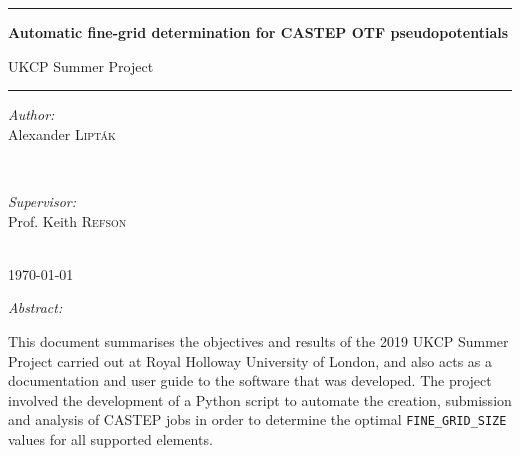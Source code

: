 \documentclass[article]{revtex4}
\begin{document}
\begin{titlepage}
\begin{center}
\vspace*{2cm}

\noindent\rule{\textwidth}{1pt}\vspace{0.5cm}

{\Large \textbf{Automatic fine-grid determination for CASTEP OTF pseudopotentials}}

\vspace{0.5cm}

{\large UKCP Summer Project}

\vspace{0.5cm}\noindent\rule{\textwidth}{1pt}

\vspace{1cm}

\begin{minipage}{0.4\textwidth}
\begin{flushleft} \large
\emph{Author:}\\
Alexander \textsc{Lipták}
\end{flushleft}
\end{minipage}
~
\begin{minipage}{0.4\textwidth}
\begin{flushright} \large
\emph{Supervisor:} \\
Prof. Keith \textsc{Refson}
\end{flushright}
\end{minipage}\\[1cm]

{\large \today}

\vspace{2cm}
    
{\large \emph{Abstract:}}

\vspace{0.5cm}

\begin{justify}
{
This document summarises the objectives and results of the 2019 UKCP Summer Project carried out at Royal Holloway University of London, and also acts as a documentation and user guide to the software that was developed. The project involved the development of a Python script to automate the creation, submission and analysis of CASTEP jobs in order to determine the optimal \texttt{FINE\_GRID\_SIZE} values for all supported elements.
}
\end{justify}

\vspace*{\fill}


\end{center}
\end{titlepage}
\end{document}
